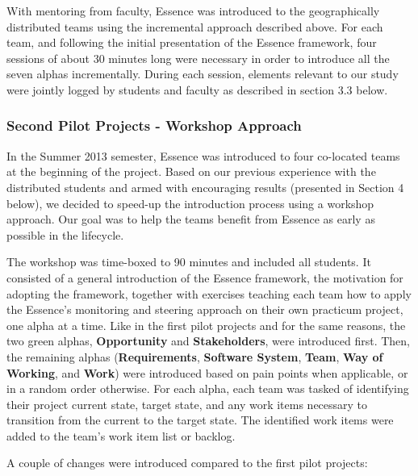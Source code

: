 With mentoring from faculty, Essence was introduced to the geographically distributed teams using the incremental approach described above. For each team, and following the initial presentation of the Essence framework, four sessions of about 30 minutes long were necessary in order to introduce all the seven alphas incrementally. During each session, elements relevant to our study were jointly logged by students and faculty as described in section 3.3 below.

\subsubsection{Second Pilot Projects - Workshop Approach}
In the Summer 2013 semester, Essence was introduced to four co-located teams at the beginning of the project. Based on our previous experience with the distributed students and armed with encouraging results (presented in Section 4 below), we decided to speed-up the introduction process using a workshop approach. Our goal was to help the teams benefit from Essence as early as possible in the lifecycle.

The workshop was time-boxed to 90 minutes and included all students. It consisted of a general introduction of the Essence framework, the motivation for adopting the framework, together with exercises teaching each team how to apply the Essence's monitoring and steering approach on their own practicum project, one alpha at a time. Like in the first pilot projects and for the same reasons, the two green  alphas, \textbf{Opportunity} and \textbf{Stakeholders}, were introduced first. Then, the remaining alphas (\textbf{Requirements}, \textbf{Software System}, \textbf{Team}, \textbf{Way of Working}, and \textbf{Work}) were introduced based on pain points when applicable, or in a random order otherwise. For each alpha, each team was tasked of identifying their project current state, target state, and any work items necessary to transition from the current to the target state. The identified work items were added to the team's work item list or backlog.

A couple of changes were introduced compared to the first pilot projects:

